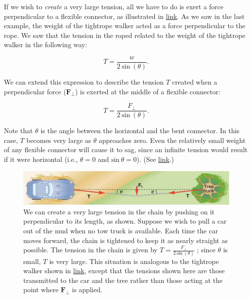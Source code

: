 \documentclass[
]{book}
\begin{document}
If we wish to \emph{create} a very large tension, all we have to do is exert
a force perpendicular to a flexible connector, as illustrated in
\protect\hyperlink{import-auto-id2847184}{link}. As we saw in the
last example, the weight of the tightrope walker acted as a force
perpendicular to the rope. We saw that the tension in the roped related
to the weight of the tightrope walker in the following way:

\leavevmode{}%
\[{T = \frac{w}{2\ \text{sin}\ (\theta)}}.\]

We can extend this expression to describe the tension \(T{}\) created when
a perpendicular force (\(\textbf{F}_{\bot}{}\)) is exerted at the middle
of a flexible connector:

\leavevmode{}%
\[{T = \frac{F_{\bot}}{2\ \text{sin}\ (\theta)}}.\]

Note that \(\theta{}\) is the angle between the horizontal and the bent
connector. In this case, \(T{}\) becomes very large as \(\theta{}\)
approaches zero. Even the relatively small weight of any flexible
connector will cause it to sag, since an infinite tension would result
if it were horizontal (i.e., \({\theta = 0}{}\) and
\({\text{sin}{\ \theta = 0}}{}\)). (See
\protect\hyperlink{import-auto-id2847184}{link}.)

\begin{figure}
\hypertarget{import-auto-id2847184}{%
\centering
\includegraphics{images/Figure_04_05_08.jpg}
\caption{We can create a very large tension in the chain by pushing on it
perpendicular to its length, as shown. Suppose we wish to pull a car out
of the mud when no tow truck is available. Each time the car moves
forward, the chain is tightened to keep it as nearly straight as
possible. The tension in the chain is given by
\({T = \frac{F_{\bot}}{2\ \text{sin}\ (\theta)}}{}\) ; since \(\theta{}\) is
small, \(T{}\) is very large. This situation is analogous to the tightrope
walker shown in \protect\hyperlink{import-auto-id2091042}{link},
except that the tensions shown here are those transmitted to the car and
the tree rather than those acting at the point where
\(\textbf{F}_{\bot}{}\) is
applied.}\label{import-auto-id2847184}
}
\end{figure}
\end{document}
